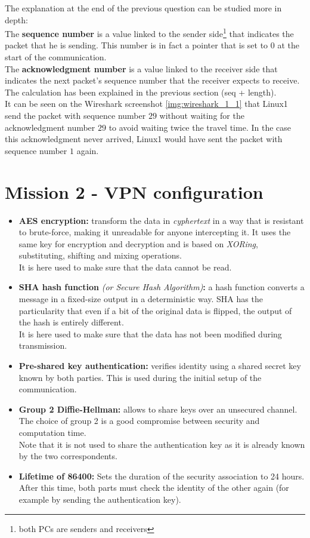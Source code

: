 \documentclass[10pt,a4paper]{ULBreport}
\begin{document}


The explanation at the end of the previous question can be studied more in depth:\\
The \textbf{sequence number} is a value linked to the sender side\footnote{both PCs are senders and receivers} that indicates the packet that he is
sending. This number is in fact a pointer that is set to $0$ at the start of the communication.\\
The \textbf{acknowledgment number} is a value linked to the receiver side that indicates the next packet's sequence number that the receiver expects to receive. The calculation has been explained in the previous section (seq + length).\\
It can be seen on the Wireshark screenshot \ref{img:wireshark_1_1} that Linux1 send the packet
with sequence number $29$ without waiting for the acknowledgment number $29$ to avoid waiting
twice the travel time. In the case this acknowledgment never arrived, Linux1 would have sent
the packet with sequence number $1$ again.


\chapter{Mission 2 - VPN configuration}



\begin{itemize}
    \item \textbf{AES encryption:} transform the data in \textit{cyphertext} in a way that is resistant to brute-force, 
    making it unreadable for anyone intercepting it. It uses the same key for encryption and decryption and is based on 
    \textit{XORing}, substituting, shifting and mixing operations.\\
    It is here used to make sure that the data cannot be read.
    \item \textbf{SHA hash function} \textit{(or Secure Hash Algorithm)}\textbf{:} a hash function converts a message in
    a fixed-size output in a deterministic way. SHA has the particularity that even if a bit of the original data is 
    flipped, the output of the hash is entirely different.\\
    It is here used to make sure that the data has not been modified during transmission.
    \item \textbf{Pre-shared key authentication:} verifies identity using a shared secret key known by both parties. 
    This is used during the initial setup of the communication.
    \item \textbf{Group 2 Diffie-Hellman:} allows to share keys over an unsecured channel. The choice of group 2 is a
    good compromise between security and computation time.\\
    Note that it is not used to share the authentication key as it is already known by the two correspondents.
    \item \textbf{Lifetime of 86400:} Sets the duration of the security association to 24 hours. After this time, both
    parts must check the identity of the other again (for example by sending the authentication key).
\end{itemize}
\end{document}
